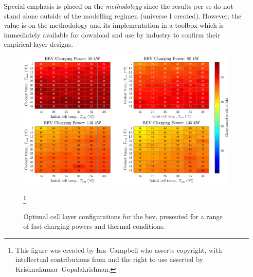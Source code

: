 Special emphasis is placed on the \emph{methodology} since the results per se do
not stand alone outside of the modelling regimen (universe I created).
However, the  value is on  the methodology and  its implementation in  a toolbox
which is immediately available for download and use by industry to confirm their
empirical layer designs.






\begin{figure}[!bp]
    \begin{minipage}[t]{\textwidth}
        \centering
        \includegraphics[width=\textwidth]{fig_generate_heatmap_BEV}
        \captionsetup{labelsep=note}
        \caption[Optimal cell layer configurations for the \gls{bev}, presented for a range of fast charging powers and thermal conditions]{Optimal cell layer configurations for the \gls{bev}, presented for a range of fast charging powers and thermal conditions.}
        \label{fig:fig_generate_heatmap_BEV}
        \mpfootnotes[1]
        \footnote{This figure was created by \mbox{Ian Campbell} who asserts copyright,
            with intellectual contributions from and the right to use asserted by
        \mbox{Krishnakumar Gopalakrishnan}.}
    \end{minipage}
\end{figure}

